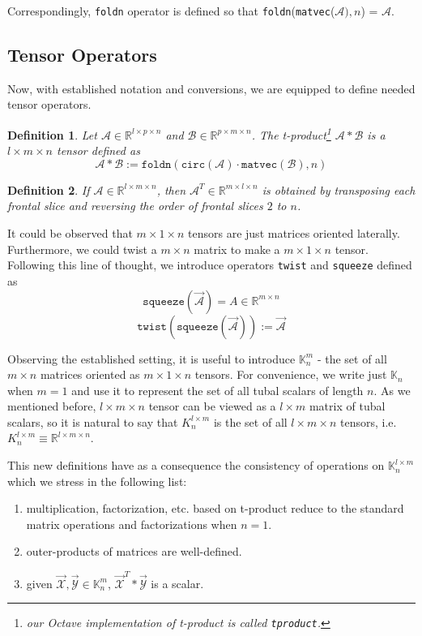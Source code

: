 \documentclass[twoside]{article}
\newtheorem{defn}{Definition}
\newcommand{\code}[1]{\texttt{#1}}
\begin{document}
\begin{multicols}{2}
\noindent Correspondingly, \code{foldn} operator is defined so that \code{foldn}(\code{matvec}($\mathcal{A}),n$) = $\mathcal{A}$.

\subsection{Tensor Operators}
Now, with established notation and conversions, we are equipped to define needed tensor operators.

\begin{defn} Let $\mathcal{A} \in \mathbb{R}^{l \times p \times n}$ and $\mathcal{B} \in \mathbb{R}^{p \times m \times n}$. The t-product\footnote{our Octave implementation of t-product is called \code{tproduct}.} $\mathcal{A} \ast \mathcal{B}$ is a $l \times m \times n$ tensor defined as
\[ \mathcal{A} \ast \mathcal{B} := \code{foldn}(\code{circ}(\mathcal{A}) \cdot \code{matvec}(\mathcal{B}) ,n) \]
\end{defn}

\begin{defn} If $\mathcal{A} \in \mathbb{R}^{l \times m \times n}$, then $\mathcal{A}^T \in \mathbb{R}^{m \times l \times n}$ is obtained by transposing each frontal slice and reversing the order of frontal slices $2$ to $n$.
\end{defn}

It could be observed that $m \times 1 \times n$ tensors are just matrices oriented laterally. Furthermore, we could twist a $m \times n$ matrix to make a $m \times 1 \times n$ tensor. Following this line of thought, we introduce operators \code{twist} and \code{squeeze} defined as
\[ \code{squeeze}(\overrightarrow{\mathcal{A}}) = A \in \mathbb{R}^{m \times n} \]
\[ \code{twist}(\code{squeeze}(\overrightarrow{\mathcal{A}})) := \overrightarrow{\mathcal{A}} \]

\noindent Observing the established setting, it is useful to introduce $\mathbb{K}^m_n$ - the set of all $m \times n$ matrices oriented as $m \times 1 \times n$ tensors. For convenience, we write just $\mathbb{K}_n$ when $m=1$ and use it to represent the set of all tubal scalars of length $n$. As we mentioned before, $l \times m \times n$ tensor can be viewed as a $l \times m$ matrix of tubal scalars, so it is natural to say that $K^{l \times m}_n$ is the set of all $l \times m \times n$ tensors, i.e. $K^{l \times m}_n \equiv \mathbb{R}^{l \times m \times n}$.

This new definitions have as a consequence the consistency of operations on $\mathbb{K}^{l \times m}_n$ which we stress in the following list:
\begin{enumerate}
	\item multiplication, factorization, etc. based on t-product reduce to the standard matrix operations and factorizations when $n=1$.
	\item outer-products of matrices are well-defined.
	\item given $\overrightarrow{\mathcal{X}}, \overrightarrow{\mathcal{Y}} \in \mathbb{K}^m_n$, $\overrightarrow{\mathcal{X}}^T \ast \overrightarrow{\mathcal{Y}}$ is a scalar.
\end{enumerate} 


\end{multicols}
\end{document}
